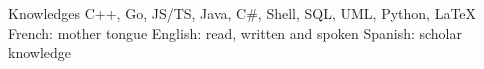 






\begin{rubric}{Knowledges}
  C++, Go, JS/TS, Java, C\#, Shell, SQL, UML, Python, \LaTeX
  \entry*[Languages]
  French: mother tongue
  \entry*
  English: read, written and spoken
  \entry*
  Spanish: scholar knowledge
\end{rubric}
